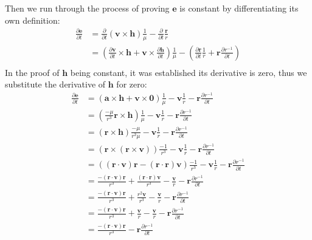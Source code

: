 \documentclass[titlepage]{article}
\begin{document}
Then we run through the process of proving $\boldsymbol{e}$ is constant by differentiating its own definition:
\begin{equation}
	\begin{split}
		\frac{\partial\boldsymbol{e}}{\partial t}&=\frac{\partial}{\partial t}\left(\boldsymbol{v}\times\boldsymbol{h}\right)\frac{1}{\mu}-\frac{\partial}{\partial t}\frac{\boldsymbol{r}}{r}\\
		&=\left(\frac{\partial\boldsymbol{v}}{\partial t}\times\boldsymbol{h}+\boldsymbol{v}\times\frac{\partial\boldsymbol{h}}{\partial t}\right)\frac{1}{\mu}-\left(\frac{\partial \boldsymbol{r}}{\partial t}\frac{1}{r}+\boldsymbol{r}\frac{\partial r^{-1}}{\partial t}\right)\\
	\end{split}
\end{equation}
In the proof of $\boldsymbol{h}$ being constant, it was established its derivative is zero, thus we substitute the derivative of $\boldsymbol{h}$ for zero:
\begin{equation}
	\begin{split}
		\frac{\partial\boldsymbol{e}}{\partial t}&=\left(\boldsymbol{a}\times\boldsymbol{h}+\boldsymbol{v}\times\boldsymbol{0}\right)\frac{1}{\mu}-\boldsymbol{v}\frac{1}{r}-\boldsymbol{r}\frac{\partial r^{-1}}{\partial t} \\
		&=\left(\frac{-\mu}{r^3}\boldsymbol{r}\times\boldsymbol{h}\right)\frac{1}{\mu}-\boldsymbol{v}\frac{1}{r}-\boldsymbol{r}\frac{\partial r^{-1}}{\partial t} \\
		&=\left(\boldsymbol{r}\times\boldsymbol{h}\right)\frac{-\mu}{r^3\mu}-\boldsymbol{v}\frac{1}{r}-\boldsymbol{r}\frac{\partial r^{-1}}{\partial t} \\
		&=\left(\boldsymbol{r}\times\left(\boldsymbol{r}\times\boldsymbol{v}\right)\right)\frac{-1}{r^3}-\boldsymbol{v}\frac{1}{r}-\boldsymbol{r}\frac{\partial r^{-1}}{\partial t} \\
		&=\left(\left(\boldsymbol{r}\cdot\boldsymbol{v}\right)\boldsymbol{r}-\left(\boldsymbol{r}\cdot\boldsymbol{r}\right)\boldsymbol{v}\right)\frac{-1}{r^3}-\boldsymbol{v}\frac{1}{r}-\boldsymbol{r}\frac{\partial r^{-1}}{\partial t} \\
		&=\frac{-\left(\boldsymbol{r}\cdot\boldsymbol{v}\right)\boldsymbol{r}}{r^3}+\frac{\left(\boldsymbol{r}\cdot\boldsymbol{r}\right)\boldsymbol{v}}{r^3}-\frac{\boldsymbol{v}}{r}-\boldsymbol{r}\frac{\partial r^{-1}}{\partial t} \\
		&=\frac{-\left(\boldsymbol{r}\cdot\boldsymbol{v}\right)\boldsymbol{r}}{r^3}+\frac{r^2\boldsymbol{v}}{r^3}-\frac{\boldsymbol{v}}{r}-\boldsymbol{r}\frac{\partial r^{-1}}{\partial t} \\
		&=\frac{-\left(\boldsymbol{r}\cdot\boldsymbol{v}\right)\boldsymbol{r}}{r^3}+\frac{\boldsymbol{v}}{r}-\frac{\boldsymbol{v}}{r}-\boldsymbol{r}\frac{\partial r^{-1}}{\partial t} \\
		&=\frac{-\left(\boldsymbol{r}\cdot\boldsymbol{v}\right)\boldsymbol{r}}{r^3}-\boldsymbol{r}\frac{\partial r^{-1}}{\partial t} \\
	\end{split}
\end{equation}
\end{document}
